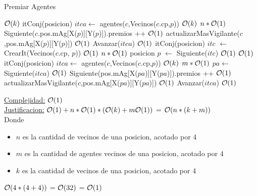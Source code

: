 \begin{Algoritmos}
\begin{algorithm}[H]
\caption{Premiar Agentes}
\begin{algorithmic}[1]
	 \Comment $\mathcal{O}(k)$
			\State itConj(posicion) $itca \gets$ agentes($c$,Vecinos($c$.cp,$p$)) \Comment $\mathcal{O}(k)$
			 \Comment $n*\mathcal{O}(1)$
				\State Siguiente($c$.pos.mAg[X($p$)][Y($p$)]).premios ++ \Comment $\mathcal{O}(1)$
				\State actualizarMasVigilante($c$,pos.mAg[X($p$)][Y($p$)]) \Comment $\mathcal{O}(1)$
				\State Avanzar($itca$) \Comment $\mathcal{O}(1)$
			\EndWhile
	\Else
	\State itConj(posicion) $itc$ $\gets$ CrearIt(Vecinos($c$.cp, $p$)) \Comment $\mathcal{O}(1)$
	 \Comment $n*\mathcal{O}(1)$
	\State posicion $p$ $\gets$ Siguiente($itc$) \Comment $\mathcal{O}(1)$
		 \Comment $\mathcal{O}(1)$
			\State itConj(posicion) $itca \gets$ agentes($c$,Vecinos($c$.cp,$p$)) \Comment $\mathcal{O}(k)$
			 \Comment $m*\mathcal{O}(1)$
				\State $pa \gets$ Siguiente($itca$) \Comment $\mathcal{O}(1)$
				\State Siguiente(pos.mAg[X($pa$)][Y($pa$)]).premios ++ \Comment $\mathcal{O}(1)$
				\State actualizarMasVigilante($c$,pos.mAg[X($pa$)][Y($pa$)]) \Comment $\mathcal{O}(1)$
				\State Avanzar($itca$) \Comment $\mathcal{O}(1)$
			\EndWhile
		\EndIf
	\EndWhile
	\EndIf
	\EndProcedure
\end{algorithmic}
\underline{Complejidad:} $\mathcal{O}(1)$\\
\underline{Justificacion:} $\mathcal{O}(1) + n*\mathcal{O}(1)*(\mathcal{O}(k) + m\mathcal{O}(1))$ = $\mathcal{O}(n*(k + m))$\\
Donde
\begin{itemize}
	\item $n$ es la cantidad de vecinos de una posicion, acotado por 4
	\item $m$ es la cantidad de agentes vecinos de una posicion, acotado por 4
	\item $k$ es la cantidad de vecinos de una posicion, acotado por 4
\end{itemize}
$\mathcal{O}(4*(4+4))$ = $\mathcal{O}(32)$ = $\mathcal{O}(1)$
\end{algorithm}



\end{Algoritmos}
